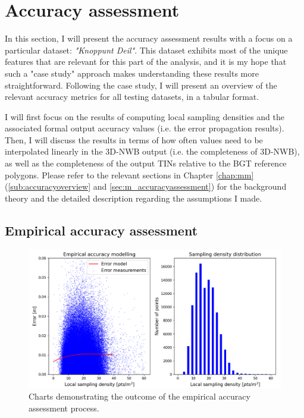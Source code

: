 \section{Accuracy assessment}
\label{sec:accuracy}

In this section, I will present the accuracy assessment results with a focus on a particular dataset: \textit{"Knoppunt Deil"}. This dataset exhibits most of the unique features that are relevant for this part of the analysis, and it is my hope that such a "case study" approach makes understanding these results more straightforward. Following the case study, I will present an overview of the relevant accuracy metrics for all testing datasets, in a tabular format.

I will first focus on the results of computing local sampling densities and the associated formal output accuracy values (i.e. the error propagation results). Then, I will discuss the results in terms of how often values need to be interpolated linearly in the 3D-NWB output (i.e. the completeness of 3D-NWB), as well as the completeness of the output TINs relative to the BGT reference polygons. Please refer to the relevant sections in Chapter \ref{chap:mm} (\ref{sub:accuracyoverview} and \ref{sec:m_accuracyassessment}) for the background theory and the detailed description regarding the assumptions I made.

\subsection{Empirical accuracy assessment}
\label{sub:accuracyempirical}

\begin{figure}
    \centering
    \includegraphics[width=0.9\linewidth]{final_report/figs/empiricalaccuracy0.png}
    \caption{Charts demonstrating the outcome of the empirical accuracy assessment process.}
    \label{fig:empiricalaccuracy0}
\end{figure}

